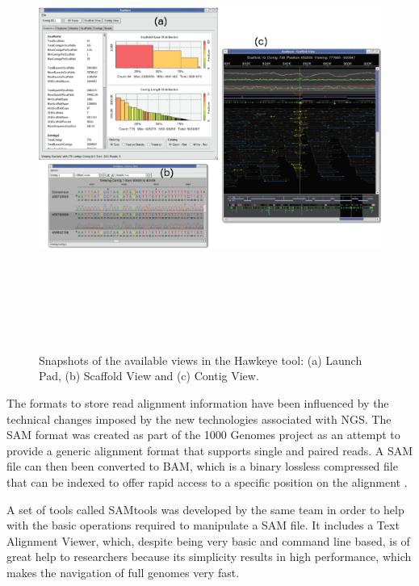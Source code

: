 \begin{figure}  
\includegraphics[height=5.7in,angle=90]{figures/hawkeye.png}
\caption[Hawkeye Interface Views.]{Snapshots of the available views in the Hawkeye tool: (a) Launch Pad, (b) Scaffold View and (c) Contig View.
\label{fig:hawkeye}}
\end{figure}

The formats to store read alignment information have been influenced by the technical changes imposed by the new technologies associated with NGS. The SAM format was created as part of the 1000 Genomes project \cite{GEN2012} as an attempt to provide a generic alignment format that supports single and paired reads. A SAM file can then been converted to BAM, which is a binary lossless compressed file that can be indexed to offer rapid access to a specific position on the alignment \cite{HEN2009}. 

A set of tools called SAMtools was developed by the same team in order to help with the basic operations required to manipulate a SAM file. It includes a Text Alignment Viewer, which, despite being very basic and command line based, is of great help to researchers because its simplicity results in high performance, which makes the navigation of full genomes very fast.


